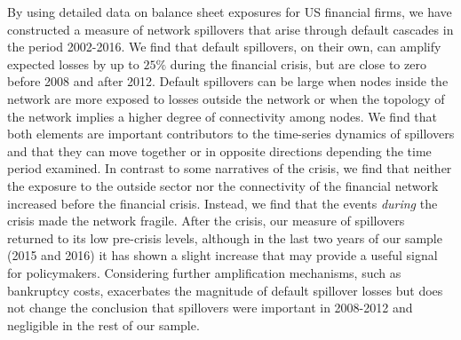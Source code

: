 By using detailed data on balance sheet exposures for US financial firms, we have constructed a measure of network spillovers that arise through default cascades in the period 2002-2016. We find that default spillovers, on their own, can amplify expected losses by up to $25\%$ during the financial crisis, but are close to zero before 2008 and after 2012. Default spillovers can be large when nodes inside the network are more exposed to losses outside the network or when the topology of the network implies a higher degree of connectivity among nodes. We find that both elements are important contributors to the time-series dynamics of spillovers and that they can move together or in opposite directions depending the time period examined. In contrast to some narratives of the crisis, we find that neither the exposure to the outside sector nor the connectivity of the financial network increased before the financial crisis. Instead, we find that the events \textit{during} the crisis made the network fragile. After the crisis, our measure of spillovers returned to its low pre-crisis levels, although in the last two years of our sample (2015 and 2016) it has shown a slight increase that may provide a useful signal for policymakers. Considering further amplification mechanisms, such as bankruptcy costs, exacerbates the magnitude of default spillover losses but does not change the conclusion that spillovers were important in 2008-2012 and negligible in the rest of our sample. 